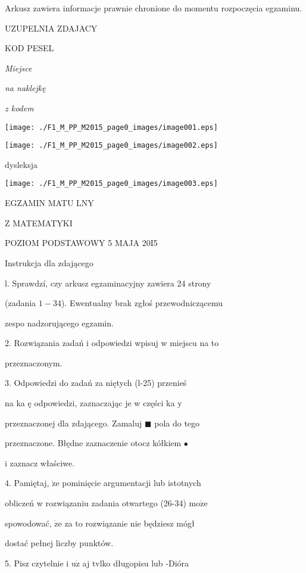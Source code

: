 \documentclass[a4paper,12pt]{article}
\begin{document}
Arkusz zawiera informacje prawnie chronione do momentu rozpoczęcia egzaminu.

UZUPELNIA ZDAJACY

KOD PESEL

{\it Miejsce}

{\it na naklejkę}

{\it z kodem}
\begin{center}
\texttt{[image: ./F1\_M\_PP\_M2015\_page0\_images/image001.eps]}

\texttt{[image: ./F1\_M\_PP\_M2015\_page0\_images/image002.eps]}
\end{center}
\fbox{} dysleksja
\begin{center}
\texttt{[image: ./F1\_M\_PP\_M2015\_page0\_images/image003.eps]}
\end{center}
EGZAMIN MATU LNY

Z MATEMATYKI

POZIOM PODSTAWOWY  5 MAJA 20I5

Instrukcja dla zdającego

l. Sprawdzí, czy arkusz egzaminacyjny zawiera 24 strony

(zadania $1-34$). Ewentualny brak zgłoś przewodniczącemu

zespo nadzorującego egzamin.

2. Rozwiązania zadań i odpowiedzi wpisuj w miejscu na to

przeznaczonym.

3. Odpowiedzi do zadań za niętych (l-25) przenieś

na ka ę odpowiedzi, zaznaczając je w części ka $\mathrm{y}$

przeznaczonej dla zdającego. Zamaluj $\blacksquare$ pola do tego

przeznaczone. Błędne zaznaczenie otocz kółkiem \fcircle$\bullet$

i zaznacz właściwe.

4. Pamiętaj, $\dot{\mathrm{z}}\mathrm{e}$ pominięcie argumentacji lub istotnych

obliczeń w rozwiązaniu zadania otwartego (26-34) $\mathrm{m}\mathrm{o}\dot{\mathrm{z}}\mathrm{e}$

spowodować, $\dot{\mathrm{z}}\mathrm{e}$ za to rozwiązanie nie będziesz mógł

dostać pełnej liczby punktów.

5. Pisz czytelnie i $\mathrm{u}\dot{\mathrm{z}}$ aj tvlko długopisu lub -Dióra
\end{document}
